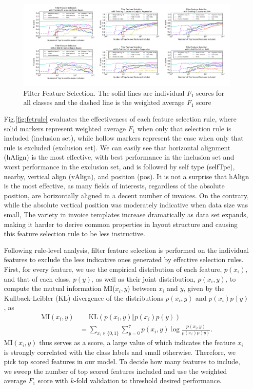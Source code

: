 \begin{figure}[ht]
\centering
\includegraphics[trim={1cm 0.8cm 0 0}, clip, width=1\linewidth]{filterFS}
\caption{Filter Feature Selection. The solid lines are individual $F_1$ scores for all classes and the dashed line is the weighted average $F_1$ score}
\label{fig:fetsel}
\end{figure}

Fig.\ref{fig:fetrule} evaluates the effectiveness of each feature selection rule, where solid markers represent weighted average $F_1$ when only that selection rule is included (inclusion set), while hollow markers represent the case when only that rule is excluded (exclusion set). We can easily see that horizontal alignment (hAlign) is the most effective, with best performance in the inclusion set and worst performance in the exclusion set, and is followed by self type (selfTpe), nearby, vertical align (vAlign), and position (pos). It is not a surprise that hAlign is the most effective, as many fields of interests, regardless of the absolute position, are horizontally aligned in a decent number of invoices. On the contrary, while the absolute vertical position was moderately indicative when data size was small, The variety in invoice templates increase dramatically as data set expands, making it harder to derive common properties in layout structure and causing this feature selection rule to be less instructive.

Following rule-level analysis, filter feature selection is performed on the individual features to exclude the less indicative ones generated by effective selection rules. First, for every feature, we use the empirical distribution of each feature, $p(x_i)$, and that of each class, $p(y)$, as well as their joint distribution, $p(x_i,y)$, to compute the mutual information MI($x_i, y$) between $x_i$ and $y$, given by the Kullback-Leibler (KL) divergence of the distributions $p(x_i, y)$ and $p(x_i)p(y)$, as
\begin{align*}
\mathrm{MI}(x_i, y) &= \mathrm{KL}(p(x_i, y)\Vert p(x_i)p(y))\\
&=\sum_{x_i\in\{0,1\}}\sum_{y=0}^7p(x_i,y)\log\frac{p(x_i, y)}{p(x_i)p(y)}.
\end{align*}
$\mathrm{MI}(x_i, y)$ thus serves as a score, a large value of which indicates the feature $x_i$ is strongly correlated with the class labels and small otherwise. Therefore, we pick top scored features in our model. To decide how many features 
to include, we sweep the number of top scored features included and use the weighted average $F_1$ score with $k$-fold validation
to threshold desired performance.


